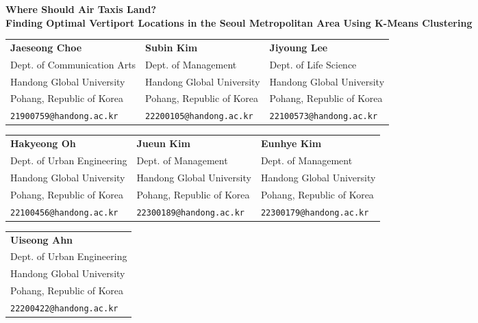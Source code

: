 \documentclass{article}
\begin{document}
\begin{center}
    {\LARGE \textbf{Where Should Air Taxis Land?}}\\[0.3em]
    {\large \textbf{Finding Optimal Vertiport Locations in the Seoul Metropolitan Area Using K-Means Clustering}}\\[2.5em]
\end{center}

\renewcommand{\arraystretch}{1.2} %
\noindent\centering
\begin{tabular}{>{\centering\arraybackslash}p{} >{\centering\arraybackslash}p{} >{\centering\arraybackslash}p{}}
\textbf{Jaeseong Choe} & \textbf{Subin Kim} & \textbf{Jiyoung Lee} \\
Dept. of Communication Arts & Dept. of Management & Dept. of Life Science \\
Handong Global University & Handong Global University & Handong Global University \\
Pohang, Republic of Korea & Pohang, Republic of Korea & Pohang, Republic of Korea \\
\texttt{21900759@handong.ac.kr} & \texttt{22200105@handong.ac.kr} & \texttt{22100573@handong.ac.kr} \\
\end{tabular}

\vspace{1.5em}

\noindent\centering
\begin{tabular}{>{\centering\arraybackslash}p{} >{\centering\arraybackslash}p{} >{\centering\arraybackslash}p{}}
\textbf{Hakyeong Oh} & \textbf{Jueun Kim} & \textbf{Eunhye Kim} \\
Dept. of Urban Engineering & Dept. of Management & Dept. of Management \\
Handong Global University & Handong Global University & Handong Global University \\
Pohang, Republic of Korea & Pohang, Republic of Korea & Pohang, Republic of Korea \\
\texttt{22100456@handong.ac.kr} & \texttt{22300189@handong.ac.kr} & \texttt{22300179@handong.ac.kr} \\
\end{tabular}

\vspace{1.5em}

\noindent\centering
\begin{tabular}{>{\centering\arraybackslash}p{}}
\textbf{Uiseong Ahn} \\
Dept. of Urban Engineering \\
Handong Global University \\
Pohang, Republic of Korea \\
\texttt{22200422@handong.ac.kr} \\
\end{tabular}
\end{document}
